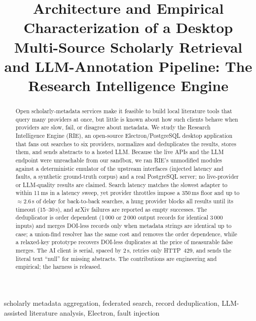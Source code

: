\documentclass[conference]{IEEEtran}
\begin{document}
\title{Architecture and Empirical Characterization of a Desktop Multi-Source Scholarly Retrieval and LLM-Annotation Pipeline: The Research Intelligence Engine}

\author{
}

\maketitle

\begin{abstract}
Open scholarly-metadata services make it feasible to build local literature tools that query many providers at once, but little is known about how such clients behave when providers are slow, fail, or disagree about metadata. We study the Research Intelligence Engine (RIE), an open-source Electron/PostgreSQL desktop application that fans out searches to six providers, normalizes and deduplicates the results, stores them, and sends abstracts to a hosted LLM. Because the live APIs and the LLM endpoint were unreachable from our sandbox, we ran RIE's unmodified modules against a deterministic emulator of the upstream interfaces (injected latency and faults, a synthetic ground-truth corpus) and a real PostgreSQL server; no live-provider or LLM-quality results are claimed. Search latency matches the slowest adapter to within 11\,ms in a latency sweep, yet provider throttles impose a 350\,ms floor and up to $\approx$2.6\,s of delay for back-to-back searches, a hung provider blocks all results until its timeout (15--30\,s), and arXiv failures are reported as empty successes. The deduplicator is order dependent (1\,000 or 2\,000 output records for identical 3\,000 inputs) and merges DOI-less records only when metadata strings are identical up to case; a union-find resolver has the same cost and removes the order dependence, while a relaxed-key prototype recovers DOI-less duplicates at the price of measurable false merges. The AI client is serial, spaced by 2\,s, retries only HTTP~429, and sends the literal text ``null'' for missing abstracts. The contributions are engineering and empirical; the harness is released.
\end{abstract}

\begin{IEEEkeywords}
scholarly metadata aggregation, federated search, record deduplication, LLM-assisted literature analysis, Electron, fault injection
\end{IEEEkeywords}
\end{document}
